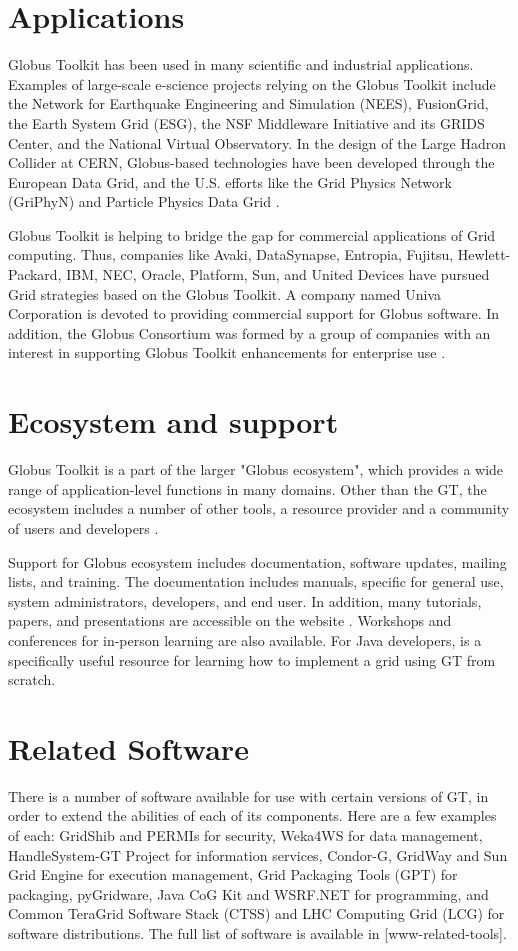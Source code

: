 \documentclass[9pt,twocolumn,twoside]{styles/osajnl}
\begin{document}
\section{Applications}
Globus Toolkit has been used in many scientific and industrial applications. Examples of large-scale e-science projects relying on the Globus Toolkit include the Network for Earthquake Engineering and Simulation (NEES), FusionGrid, the Earth System Grid (ESG), the NSF Middleware Initiative and its GRIDS Center, and the National Virtual Observatory. In the design of the Large Hadron Collider at CERN, Globus-based technologies have been developed through the European Data Grid, and the U.S. efforts like the Grid Physics Network (GriPhyN) and Particle Physics Data Grid \cite{www-about-globus}.

Globus Toolkit is helping to bridge the gap for commercial applications of Grid computing. Thus, companies like Avaki, DataSynapse, Entropia, Fujitsu, Hewlett-Packard, IBM, NEC, Oracle, Platform, Sun, and United Devices have pursued Grid strategies based on the Globus Toolkit. 
A company named Univa Corporation is devoted to providing commercial support for Globus software. In addition, the Globus Consortium was formed by a group of companies with an interest in supporting Globus Toolkit enhancements for enterprise use \cite{www-about-globus}.

\section{Ecosystem and support}
Globus Toolkit is a part of the larger "Globus ecosystem", which provides a wide range of application-level functions in many domains. Other than the GT, the ecosystem includes a number of other tools, a resource provider and a community of users and developers \cite{foster2006globus}.

Support for Globus ecosystem includes documentation, software updates, mailing lists, and training. The documentation includes manuals, specific for general use, system administrators, developers, and end user. In addition, many tutorials, papers, and presentations are accessible on the website \cite{www-globus-tutorial}. Workshops and conferences for in-person learning are also available. For Java developers, \cite{sotomayor2006globus} is a specifically useful resource for learning how to implement a grid using GT from scratch.

\section{Related Software}
There is a number of software available for use with certain versions of GT, in order to extend the abilities of each of its components. Here are a few examples of each: GridShib and PERMIs for security, Weka4WS for data management, HandleSystem-GT Project for information services, Condor-G, GridWay and Sun Grid Engine for execution management, Grid Packaging Tools (GPT) for packaging, pyGridware, Java CoG Kit and WSRF.NET for programming, and Common TeraGrid Software Stack (CTSS) and LHC Computing Grid (LCG) for software distributions. The full list of software is available in [www-related-tools].
\end{document}
